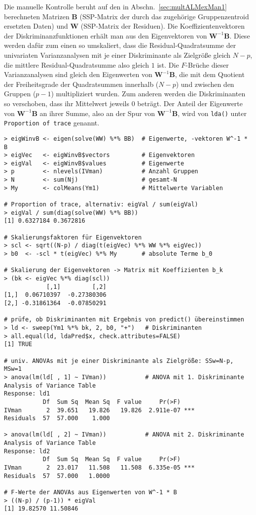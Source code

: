 Die manuelle Kontrolle beruht auf den in Abschn.\ \ref{sec:multALMexMan1} berechneten Matrizen $\bm{B}$ (SSP-Matrix der durch das zugehörige Gruppenzentroid ersetzten Daten) und $\bm{W}$ (SSP-Matrix der Residuen). Die Koeffizientenvektoren der Diskriminanzfunktionen erhält man aus den Eigenvektoren von $\bm{W}^{-1} \bm{B}$. Diese werden dafür zum einen so umskaliert, dass die Residual-Quadratsumme der univariaten Varianzanalysen mit je einer Diskriminante als Zielgröße gleich $N-p$, die mittlere Residual-Quadratsumme also gleich $1$ ist. Die $F$-Brüche dieser Varianzanalysen sind gleich den Eigenwerten von $\bm{W}^{-1} \bm{B}$, die mit dem Quotient der Freiheitsgrade der Quadratsummen innerhalb ($N-p$) und zwischen den Gruppen ($p-1$) multipliziert wurden. Zum anderen werden die Diskriminanten so verschoben, dass ihr Mittelwert jeweils $0$ beträgt. Der Anteil der Eigenwerte von $\bm{W}^{-1} \bm{B}$ an ihrer Summe, also an der Spur von $\bm{W}^{-1} \bm{B}$, wird von \lstinline!lda()! unter \lstinline!Proportion of trace! genannt.
\begin{lstlisting}
> eigWinvB <- eigen(solve(WW) %*% BB)  # Eigenwerte, -vektoren W^-1 * B
> eigVec   <- eigWinvB$vectors         # Eigenvektoren
> eigVal   <- eigWinvB$values          # Eigenwerte
> p        <- nlevels(IVman)           # Anzahl Gruppen
> N        <- sum(Nj)                  # gesamt-N
> My       <- colMeans(Ym1)            # Mittelwerte Variablen

# Proportion of trace, alternativ: eigVal / sum(eigVal)
> eigVal / sum(diag(solve(WW) %*% BB))
[1] 0.6327184 0.3672816

# Skalierungsfaktoren für Eigenvektoren
> scl <- sqrt((N-p) / diag(t(eigVec) %*% WW %*% eigVec))
> b0  <- -scl * t(eigVec) %*% My       # absolute Terme b_0

# Skalierung der Eigenvektoren -> Matrix mit Koeffizienten b_k
> (bk <- eigVec %*% diag(scl))
            [,1]         [,2]
[1,]  0.06710397  -0.27380306
[2,] -0.31861364  -0.07850291

# prüfe, ob Diskriminanten mit Ergebnis von predict() übereinstimmen
> ld <- sweep(Ym1 %*% bk, 2, b0, "+")   # Diskriminanten
> all.equal(ld, ldaPred$x, check.attributes=FALSE)
[1] TRUE

# univ. ANOVAs mit je einer Diskriminante als Zielgröße: SSw=N-p, MSw=1
> anova(lm(ld[ , 1] ~ IVman))           # ANOVA mit 1. Diskriminante
Analysis of Variance Table
Response: ld1
           Df  Sum Sq  Mean Sq  F value     Pr(>F)
IVman       2  39.651   19.826   19.826  2.911e-07 ***
Residuals  57  57.000    1.000

> anova(lm(ld[ , 2] ~ IVman))           # ANOVA mit 2. Diskriminante
Analysis of Variance Table
Response: ld2
           Df  Sum Sq  Mean Sq  F value     Pr(>F)
IVman       2  23.017   11.508   11.508  6.335e-05 ***
Residuals  57  57.000   1.0000

# F-Werte der ANOVAs aus Eigenwerten von W^-1 * B
> ((N-p) / (p-1)) * eigVal
[1] 19.82570 11.50846
\end{lstlisting}

